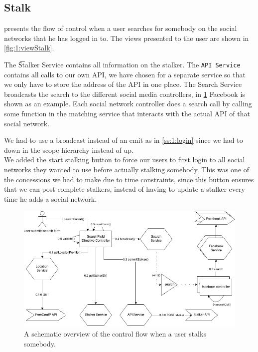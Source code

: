 \subsection{Stalk}
	 presents the flow of control when a user searches for somebody on the social networks that he has logged in to. The views presented to the user are shown in \autoref{fig:1:viewStalk}. 

	The \t{Stalker Service} contains all information on the stalker. The \texttt{API Service} contains all calls to our own API, we have chosen for a separate service so that we only have to store the address of the API in one place. The Search Service broadcasts the search to the different social media controllers, in \cref{fig:1:controlflowStalk} Facebook is shown as an example. Each social network controller does a search call by calling some function in the matching service that interacts with the actual API of that social network.


	We had to use a broadcast instead of an emit as in \cref{ss:1:login} since we had to down in the scope hierarchy instead of up. \\

	We added the start stalking button to force our users to first login to all social networks they wanted to use before actually stalking somebody. This was one of the concessions we had to make due to time constraints, since this button ensures that we can post complete stalkers, instead of having to update a stalker every time he adds a social network. 

		\begin{figure}
			\includegraphics[width=\textwidth]{./img/1_stalking_flow}
			\caption{A schematic overview of the control flow when a user stalks somebody.}
			\label{fig:1:controlflowStalk}
		\end{figure}	

